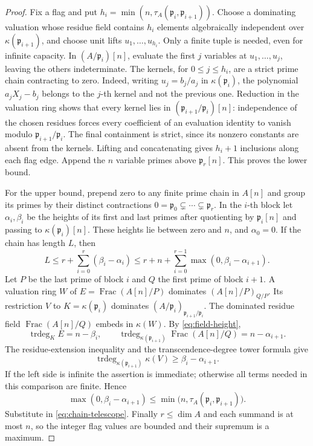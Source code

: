 \documentclass[11pt,reqno]{amsart}
\numberwithin{equation}{section}
\theoremstyle{plain}
\theoremstyle{definition}
\theoremstyle{remark}
\begin{document}
\begin{proof}
Fix a flag and put
\(h_i=\min(n,\tau_A(\mathfrak p_i,\mathfrak p_{i+1}))\).
Choose a dominating valuation whose residue field contains \(h_i\)
elements algebraically independent over \(\kappa(\mathfrak p_{i+1})\),
and choose unit lifts \(u_1,\ldots,u_{h_i}\). Only a finite tuple is
needed, even for infinite capacity. In \((A/\mathfrak p_i)[n]\),
evaluate the first \(j\) variables at \(u_1,\ldots,u_j\), leaving
the others indeterminate. The kernels, for \(0\leq j\leq h_i\),
are a strict prime chain contracting to zero. Indeed, writing
\(u_j=b_j/a_j\) in \(\kappa(\mathfrak p_i)\), the polynomial
\(a_jX_j-b_j\) belongs to the \(j\)-th kernel and not the previous one.
Reduction in the valuation ring shows that every kernel lies in
\((\mathfrak p_{i+1}/\mathfrak p_i)[n]\): independence of the chosen
residues forces every coefficient of an evaluation identity to vanish
modulo \(\mathfrak p_{i+1}/\mathfrak p_i\). The final containment is
strict, since its nonzero constants are absent from the kernels.
Lifting and concatenating gives \(h_i+1\) inclusions along each flag
edge. Append the \(n\) variable primes above \(\mathfrak p_r[n]\).
This proves the lower bound.

For the upper bound, prepend zero to any finite prime chain in \(A[n]\)
and group its primes by their distinct contractions
\(0=\mathfrak p_0\subsetneq\cdots\subsetneq\mathfrak p_r\).
In the \(i\)-th block let \(\alpha_i,\beta_i\) be the heights of
its first and last primes after quotienting by \(\mathfrak p_i[n]\)
and passing to \(\kappa(\mathfrak p_i)[n]\). These heights lie
between zero and \(n\), and \(\alpha_0=0\). If the chain has length
\(L\), then
\begin{equation}\label{eq:chain-telescope}
 L\leq r+\sum_{i=0}^r(\beta_i-\alpha_i)
 \leq r+n+\sum_{i=0}^{r-1}\max(0,\beta_i-\alpha_{i+1}).
\end{equation}
Let \(P\) be the last prime of block \(i\) and \(Q\) the first
prime of block \(i+1\). A valuation ring \(W\) of
\(E=\operatorname{Frac}(A[n]/P)\) dominates
\((A[n]/P)_{Q/P}\). Its restriction \(V\) to
\(K=\kappa(\mathfrak p_i)\) dominates
\((A/\mathfrak p_i)_{\mathfrak p_{i+1}/\mathfrak p_i}\).
The dominated residue field \(\operatorname{Frac}(A[n]/Q)\)
embeds in \(\kappa(W)\). By \eqref{eq:field-height},
\[
 \operatorname{trdeg}_K E=n-\beta_i,
 \qquad
 \operatorname{trdeg}_{\kappa(\mathfrak p_{i+1})}
       \operatorname{Frac}(A[n]/Q)=n-\alpha_{i+1}.
\]
The residue-extension inequality and the transcendence-degree tower
formula give
\[
 \operatorname{trdeg}_{\kappa(\mathfrak p_{i+1})}\kappa(V)
       \geq\beta_i-\alpha_{i+1}.
\]
If the left side is infinite the assertion is immediate; otherwise
all terms needed in this comparison are finite. Hence
\[
 \max(0,\beta_i-\alpha_{i+1})
 \leq\min\bigl(n,\tau_A(\mathfrak p_i,\mathfrak p_{i+1})\bigr).
\]
Substitute in \eqref{eq:chain-telescope}. Finally \(r\leq\dim A\)
and each summand is at most \(n\), so the integer flag values are
bounded and their supremum is a maximum.
\end{proof}
\end{document}
